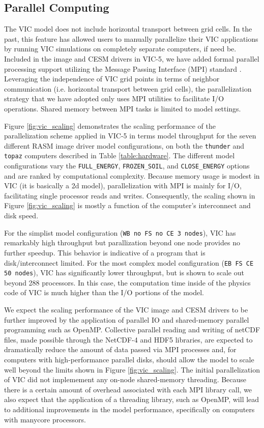 \documentclass[gmd, manuscript]{copernicus}
\begin{document}
  \subsection{Parallel Computing}
    \label{sec:mpi}
    The VIC model does not include horizontal transport between grid cells.
    In the past, this feature has allowed users to manually parallelize their VIC applications by running VIC simulations on completely separate computers, if need be.
    Included in the image and CESM drivers in VIC-5, we have added formal parallel processing support utilizing the Message Passing Interface (MPI) standard \citep{Gropp_1996}.
    Leveraging the independence of VIC grid points in terms of neighbor communication (i.e. horizontal transport between grid cells), the parallelization strategy that we have adopted only uses MPI utilities to facilitate I/O operations.
    Shared memory between MPI tasks is limited to model settings.

    Figure \ref{fig:vic_scaling} demonstrates the scaling performance of the parallelization scheme applied in VIC-5 in terms model throughput for the seven different RASM image driver model configurations, on both the \verb|thunder| and \verb|topaz| computers described in Table \ref{table:hardware}.
    The different model configurations vary the \verb|FULL_ENERGY|, \verb|FROZEN_SOIL|, and \verb|CLOSE_ENERGY| options and are ranked by computational complexity.
    Because memory usage is modest in VIC (it is basically a 2d model), parallelization with MPI is mainly for I/O, facilitating single processor reads and writes.
    Consequently, the scaling shown in Figure \ref{fig:vic_scaling} is mostly a function of the computer's interconnect and disk speed.

    For the simplist model configuration (\verb|WB no FS no CE 3 nodes|), VIC has remarkably high throughput but parallization beyond one node provides no further speedup.
    This behavior is indicative of a program that is disk/interconnect limited.
    For the most complex model configuration (\verb|EB FS CE 50 nodes|), VIC has significantly lower throughput, but is shown to scale out beyond 288 processors.
    In this case, the computation time inside of the physics code of VIC is much higher than the I/O portions of the model.

    We expect the scaling performance of the VIC image and CESM drivers to be further improved by the application of parallel IO and shared-memory parallel programming such as OpenMP.
    Collective parallel reading and writing of netCDF files, made possible through the NetCDF-4 and HDF5 libraries, are expected to dramatically reduce the amount of data passed via MPI processes and, for computers with high-performance parallel disks, should allow the model to scale well beyond the limits shown in Figure \ref{fig:vic_scaling}.
    The initial parallelization of VIC did not implemement any on-node shared-memory threading.
    Because there is a certain amount of overhead associated with each MPI library call, we also expect that the application of a threading library, such as OpenMP, will lead to additional improvements in the model performance, specifically on computers with manycore processors.
\end{document}
